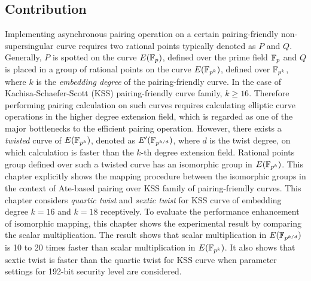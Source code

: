 \subsection{Contribution}
Implementing asynchronous pairing operation on a certain pairing-friendly non-supersingular curve requires two rational points typically denoted as $P$ and $Q$. 
Generally, $P$ is spotted on the curve  $E(\mathbb{F}_p)$, defined over the prime field $\mathbb{F}_p$ and $Q$ is placed in a group of rational points on the curve $E(\mathbb{F}_{p^k})$, defined over $\mathbb{F}_{p^k}$, where $k$ is the \textit{embedding degree} of the pairing-friendly curve. 
In the case of  Kachisa-Schaefer-Scott (KSS) pairing-friendly curve family, $k \geq 16$.
Therefore performing pairing calculation on such curves requires calculating elliptic curve operations in the higher degree extension field, which is regarded as one of the major bottlenecks to the efficient pairing operation. 
However, there exists a \textit{twisted} curve of $E(\mathbb{F}_{p^k})$, denoted as  $E'(\mathbb{F}_{p^{k/d}})$, where $d$ is the twist degree, on which calculation is faster than the $k$-th degree extension field. 
Rational points group defined over such a twisted curve has an isomorphic group in $E(\mathbb{F}_{p^k})$. 
This chapter explicitly shows the mapping procedure between the isomorphic groups in the context of Ate-based pairing over KSS family of pairing-friendly curves. 
This chapter considers \textit{quartic twist} and \textit{sextic twist} for KSS curve of embedding degree $k =16$ and $k=18$ receptively. 
To evaluate the performance enhancement of isomorphic mapping, this chapter shows the experimental result by comparing the scalar multiplication. 
The result shows that scalar multiplication in $E(\mathbb{F}_{p^{k/d}})$ is 10 to 20  times faster than scalar multiplication in $E(\mathbb{F}_{p^k})$. 
It also shows that sextic twist is faster than the quartic twist for KSS curve when parameter settings for 192-bit security level are considered. 

